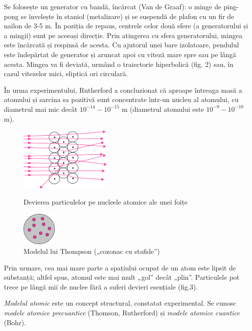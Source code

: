 Se folosește un generator cu bandă, încărcat (Van de Graaf): o minge de
ping-pong se învelește în staniol (metalizare) și se suspendă de plafon cu un
fir de nailon de 3-5 m. În poziția de repaus, centrele celor două sfere (a
generatorului și a mingii) sunt pe aceeași direcție. Prin atingerea cu sfera
generatorului, mingea este încărcată și respinsă de acesta. Cu ajutorul unei
bare izolatoare, pendulul este îndepărtat de generator și aruncat apoi cu
viteză mare spre sau pe lângă acesta. Mingea va fi deviată, urmând o
traiectorie hiperbolică (fig. 2) sau, în cazul vitezelor
mici, eliptică ori circulară.

În urma experimentului, Rutherford a concluzionat că aproape întreaga masă a
atomului și sarcina sa pozitivă sunt concentrate într-un nucleu al atomului, cu
diametrul mai mic decât $10^{-14} - 10^{-15}$ m (diametrul atomului este
$10^{-9} - 10^{-10}$ m).

\begin{figure}
    \centering
    \includegraphics[width=0.4\textwidth]{fig/deviere}
    \caption{Devierea particulelor {\alpha} pe nucleele atomice ale unei foițe}
    \vspace{0.5cm}
    \includegraphics[width=0.15\textwidth]{fig/thomson}
    \captionsetup{width=5cm}
    \caption{Modelul lui Thompson („cozonac cu stafide”)}
\end{figure}

Prin urmare, cea mai mare parte a spațiului ocupat de un atom este lipsit de
substanță; altfel spus, atomul este mai mult „gol” decât „plin”. Particulele
{\alpha} pot trece pe lângă mii de nuclee fără a suferi devieri esențiale
(fig.3).

\emph{Modelul atomic} este un concept structural, constatat experimental. Se
cunosc \emph{modele atomice precuantice} (Thomson, Rutherford) și
\emph{modele atomice cuantice} (Bohr).

